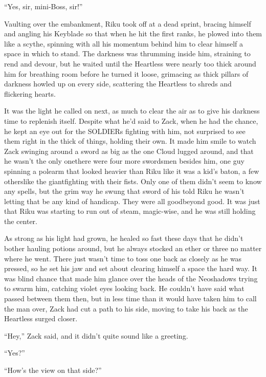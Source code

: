 ``Yes, sir, mini-Boss, sir!''

\scenechange

Vaulting over the embankment, Riku took off at a dead sprint, bracing himself and angling his Keyblade so that when he hit the first ranks, he plowed into them like a scythe, spinning with all his momentum behind him to clear himself a space in which to stand. The darkness was thrumming inside him, straining to rend and devour, but he waited until the Heartless were nearly too thick around him for breathing room before he turned it loose, grimacing as thick pillars of darkness howled up on every side, scattering the Heartless to shreds and flickering hearts.

It was the light he called on next, as much to clear the air as to give his darkness time to replenish itself. Despite what he'd said to Zack, when he had the chance, he kept an eye out for the SOLDIERs fighting with him, not surprised to see them right in the thick of things, holding their own. It made him smile to watch Zack swinging around a sword as big as the one Cloud lugged around, and that he wasn't the only one\textemdash there were four more swordsmen besides him, one guy spinning a polearm that looked heavier than Riku like it was a kid's baton, a few others\textemdash like the giant\textemdash fighting with their fists. Only one of them didn't seem to know any spells, but the grim way he swung that sword of his told Riku he wasn't letting that be any kind of handicap. They were all good\textemdash beyond good. It was just that Riku was starting to run out of steam, magic-wise, and he was still holding the center.

As strong as his light had grown, he healed so fast these days that he didn't bother hauling potions around, but he always stocked an ether or three no matter where he went. There just wasn't time to toss one back as closely as he was pressed, so he set his jaw and set about clearing himself a space the hard way. It was blind chance that made him glance over the heads of the Neoshadows trying to swarm him, catching violet eyes looking back. He couldn't have said what passed between them then, but in less time than it would have taken him to call the man over, Zack had cut a path to his side, moving to take his back as the Heartless surged closer.

``Hey,'' Zack said, and it didn't quite sound like a greeting.

``Yes?''

``How's the view on that side?''

